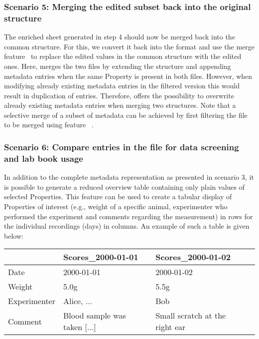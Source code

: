 \subsubsection*{Scenario 5: Merging the edited subset back into the original structure}
The enriched  sheet generated in step 4 should now be merged back into the common  structure. For this, we convert it back into the  format and use the  merge feature \fmerge\ to replace the edited values in the common  structure with the edited ones. Here,  merges the two  files by extending the  structure and appending metadata entries when the same Property is present in both files. However, when modifying already existing metadata entries in the filtered version this would result in duplication of entries. Therefore,  offers the possibility to overwrite already existing metadata entries when merging two  structures. Note that a selective merge of a subset of metadata can be achieved by first filtering the file to be merged using feature \ffilter\ . 


\subsubsection*{Scenario 6: Compare entries in the  file for data screening and lab book usage}
In addition to the complete metadata representation as presented in scenario 3, it is possible to generate a reduced overview table containing only plain values of selected Properties. This feature can be used to create a tabular display of Properties of interest (e.g., weight of a specific animal, experimenter who performed the experiment and comments regarding the measurement) in rows for the individual recordings (days) in columns. An example of such a table is given below:

\begin{center}
\begin{tabular}{|l||l|l|l|}
\hline
				 & Scores\_2000-01-01 & Scores\_2000-01-02\\
\hline
Date             &  2000-01-01 & 2000-01-02\\
\hline
Weight           &  5.0g & 5.5g\\
\hline
Experimenter     & Alice, ... & Bob\\
\hline
Comment  & Blood sample was taken [...] & Small scratch at the right ear \\
\hline
\end{tabular}
\end{center}

